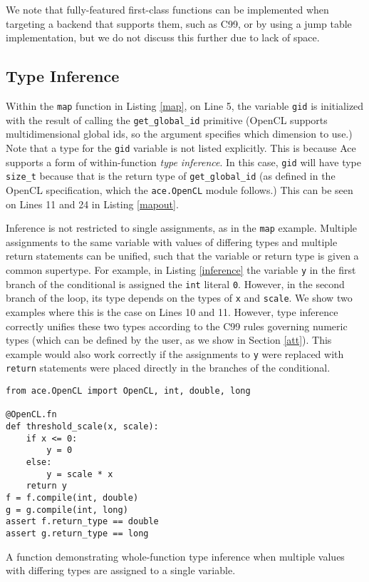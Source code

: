 \documentclass[10pt, conference, compsocconf]{IEEEtran}
\begin{document}
We note that fully-featured first-class functions can be implemented when targeting a backend that supports them, such as C99, or by using a jump table implementation, but we do not discuss this further due to lack of space. 

\subsection{Type Inference}
Within the \verb|map| function in Listing \ref{map}, on Line 5, the variable \verb|gid| is initialized with the result of calling the \verb|get_global_id| primitive (OpenCL supports multidimensional global ids, so the argument specifies which dimension to use.)  Note that a type for the \verb|gid| variable is not listed explicitly. This is because Ace supports a form of within-function {\em type inference}. In this case, \verb|gid| will have type \verb|size_t| because that is the return type of \verb|get_global_id| (as defined in the OpenCL specification, which the \verb|ace.OpenCL| module follows.) This can be seen on Lines 11 and 24 in Listing \ref{mapout}. 

Inference is not restricted to single assignments, as in the \verb|map| example. Multiple assignments to the same variable with values of differing types and multiple return statements can be unified, such that the variable or return type is given a common supertype. For example, in Listing \ref{inference} the variable \verb|y| in the first branch of the conditional is assigned the \verb|int| literal \verb|0|. However, in the second branch of the loop, its type depends on the types of \verb|x| and \verb|scale|. We show two examples where this is the case on Lines 10 and 11. However, type inference correctly unifies these two types according to the C99 rules governing numeric types (which can be defined by the user, as we show in Section \ref{att}). This example would also work correctly if the assignments to \verb|y| were replaced with \verb|return| statements were placed directly in the branches of the conditional.

\begin{codelisting}
\begin{lstlisting}
from ace.OpenCL import OpenCL, int, double, long

@OpenCL.fn
def threshold_scale(x, scale):
    if x <= 0:
        y = 0
    else:
        y = scale * x
    return y
f = f.compile(int, double)
g = g.compile(int, long)
assert f.return_type == double
assert g.return_type == long
\end{lstlisting}
\caption{A function demonstrating whole-function type inference when multiple values with differing types are assigned to a single variable.}
\label{inference}
\end{codelisting}
\end{document}
